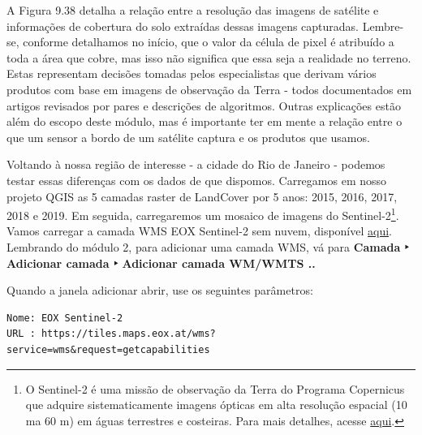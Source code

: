 \documentclass[
]{book}
\begin{document}
A Figura 9.38 detalha a relação entre a resolução das imagens de satélite e informações de cobertura do solo extraídas dessas imagens capturadas. Lembre-se, conforme detalhamos no início, que o valor da célula de pixel é atribuído a toda a área que cobre, mas isso não significa que essa seja a realidade no terreno. Estas representam decisões tomadas pelos especialistas que derivam vários produtos com base em imagens de observação da Terra - todos documentados em artigos revisados \hspace{0pt}\hspace{0pt}por pares e descrições de algoritmos. Outras explicações estão além do escopo deste módulo, mas é importante ter em mente a relação entre o que um sensor a bordo de um satélite captura e os produtos que usamos.

Voltando à nossa região de interesse - a cidade do Rio de Janeiro - podemos testar essas diferenças com os dados de que dispomos. Carregamos em nosso projeto QGIS as 5 camadas raster de LandCover por 5 anos: 2015, 2016, 2017, 2018 e 2019. Em seguida, carregaremos um mosaico de imagens do Sentinel-2\footnote{O Sentinel-2 é uma missão de observação da Terra do Programa Copernicus que adquire sistematicamente imagens ópticas em alta resolução espacial (10 ma 60 m) em águas terrestres e costeiras. Para mais detalhes, acesse \href{https://sentinel.esa.int/web/sentinel/missions/sentinel-2}{aqui}.}. Vamos carregar a camada WMS EOX Sentinel-2 sem nuvem, disponível \href{https://s2maps.eu/}{aqui}. Lembrando do módulo 2, para adicionar uma camada WMS, vá para \textbf{Camada ‣ Adicionar camada ‣ Adicionar camada WM/WMTS ..}

Quando a janela adicionar abrir, use os seguintes parâmetros:

\begin{verbatim}
Nome: EOX Sentinel-2
URL : https://tiles.maps.eox.at/wms?service=wms&request=getcapabilities
\end{verbatim}
\end{document}
